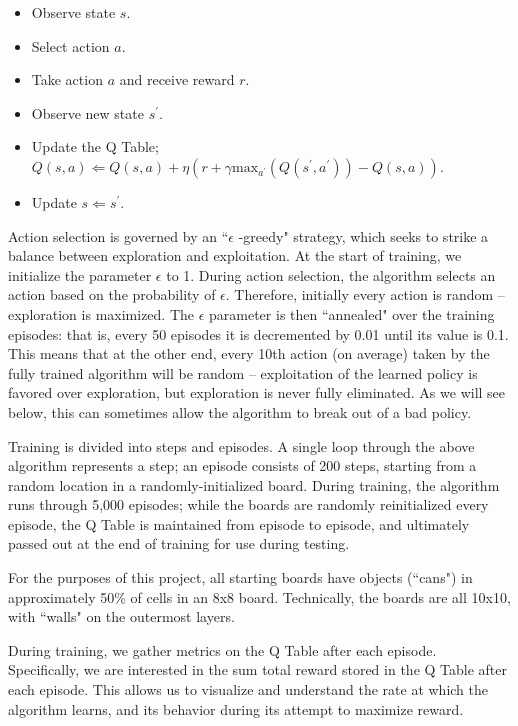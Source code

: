 \documentclass[12pt,a4paper]{article}
\begin{document}
		\begin{itemize}
			\item Observe state $s$.
			\item Select action $a$.
			\item Take action $a$ and receive reward $r$.
			\item Observe new state $s^\prime$.
			\item Update the Q Table; $Q(s,a) \Leftarrow Q(s,a) + \eta(r + \gamma \text{max}_{a^\prime}(Q(s^\prime, a^\prime)) - Q(s,a))$.
			\item Update $s \Leftarrow s^\prime$.
		\end{itemize}
		
		\par Action selection is governed by an ``$\epsilon$ -greedy" strategy, which seeks to strike a balance between exploration and exploitation. At the start of training, we initialize the parameter $\epsilon$ to 1. During action selection, the algorithm selects an action based on the probability of $\epsilon$. Therefore, initially every action is random -- exploration is maximized. The $\epsilon$ parameter is then ``annealed" over the training episodes: that is, every 50 episodes it is decremented by 0.01 until its value is 0.1. This means that at the other end, every 10th action (on average) taken by the fully trained algorithm will be random -- exploitation of the learned policy is favored over exploration, but exploration is never fully eliminated. As we will see below, this can sometimes allow the algorithm to break out of a bad policy. 
		\par Training is divided into steps and episodes. A single loop through the above algorithm represents a step; an episode consists of 200 steps, starting from a random location in a randomly-initialized board. During training, the algorithm runs through 5,000 episodes; while the boards are randomly reinitialized every episode, the Q Table is maintained from episode to episode, and ultimately passed out at the end of training for use during testing.
		\par For the purposes of this project, all starting boards have objects (``cans") in approximately 50\% of cells in an 8x8 board. Technically, the boards are all 10x10, with ``walls" on the outermost layers.
		\par During training, we gather metrics on the Q Table after each episode. Specifically, we are interested in the sum total reward stored in the Q Table after each episode. This allows us to visualize and understand the rate at which the algorithm learns, and its behavior during its attempt to maximize reward.
\end{document}
